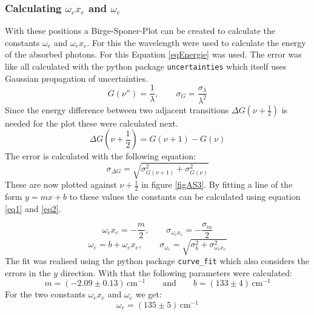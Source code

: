 \subsubsection{Calculating $\omega_ex_e$ and $\omega_e$}
With these positions a Birge-Sponer-Plot can be created to calculate the constants $\omega_e$ and $\omega_ex_e$. For this the wavelength were used to calculate the energy of the absorbed photons. For this Equation \ref{eqEnergie} was used. The error was like all calculated with the python package \verb|uncertainties|\cite{uncertainties} which itself uses Gaussian propagation of uncertainties.
\begin{equation}
	G(\nu'')=\frac{1}{\lambda}, \qquad \sigma_G=\frac{\sigma_\lambda}{\lambda^2}
	\label{eqEnergie}
\end{equation}
Since the energy difference between two adjacent transitions $\Delta G(\nu+\frac{1}{2})$ is needed for the plot these were calculated next. 
\begin{equation}
	\Delta G(\nu+\frac{1}{2}) = G(\nu+1)-G(\nu) 
\end{equation}
The error is calculated with the following equation:
\begin{equation}
	\sigma_{\Delta G} = \sqrt{\sigma_{G(\nu+1)}^2+\sigma_{G(\nu)}^2}
\end{equation}
These are now plotted against $\nu+\frac{1}{2}$ in figure \ref{figAS3}. By fitting a line of the form $y=mx+b$ to these values the constants can be calculated using equation \ref{eq1} and \ref{eq2}.\par
\begin{equation}
	\omega_ex_e = -\frac{m}{2}, \qquad \sigma_{\omega_ex_e}=-\frac{\sigma_m}{2}
	\label{eq1}
\end{equation}
\begin{equation}
	\omega_e=b+\omega_ex_e, \qquad \sigma_{\omega_e}=\sqrt{\sigma_b^2+\sigma_{\omega_ex_e}^2}
	\label{eq2}
\end{equation}
The fit was realised using the python package \verb|curve_fit|\cite{SciPy_Opti} which also considers the errors in the $y$ direction. With that the following parameters were calculated:
\begin{equation*}
	m = (-2.09\pm 0.13)\,\text{cm}^{-1} \qquad \text{and} \qquad b = (133\pm 4)\,\text{cm}^{-1}
\end{equation*}
For the two constants $\omega_ex_e$ and $\omega_e$ we get:
\begin{equation*}
	\omega_e = (135\pm 5)\,\text{cm}^{-1}
\end{equation*}
